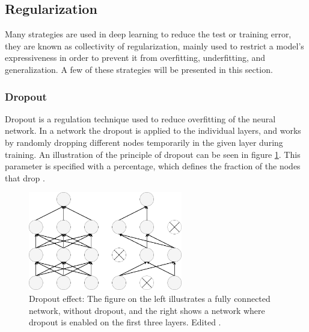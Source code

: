 

\subsection{Regularization}
Many strategies are used in deep learning to reduce the test or training error, they are known as collectivity of regularization\citep{Goodfellow2016}, mainly used to restrict a model's expressiveness in order to prevent it from overfitting, underfitting, and generalization. A few of these strategies will be presented in this section.

\subsubsection{Dropout}\label{sec:dropout}
Dropout is a regulation technique used to reduce overfitting of the neural network. In a network the dropout is applied to the individual layers, and works by randomly dropping different nodes temporarily in the given layer during training. An illustration of the principle of dropout can be seen in figure \ref{fig:Dropout}. This parameter is specified with a percentage, which defines the fraction of the nodes that drop \citep{Chollet2015}.

\begin{figure} [H]
\centering
\includegraphics[width=0.6\textwidth]{figures/Dropout}
\caption{Dropout effect: The figure on the left illustrates a fully connected network, without dropout, and the right shows a network where dropout is enabled on the first three layers. Edited \citep{Srivastava2014}.}
\label{fig:Dropout} 
\end{figure}

